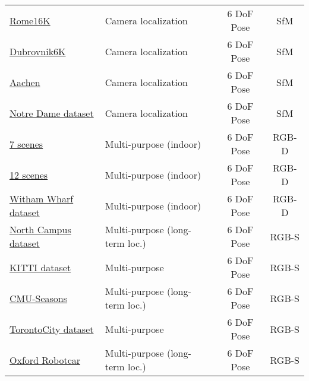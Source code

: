 \begin{landscape}
\begin{table}
{\begin{tabular}{l  l  c  c}
			\href{http://www.cs.cornell.edu/projects/p2f/}{Rome16K} \citep{Li2010} & Camera localization & 6 DoF Pose & SfM \\
			\href{http://www.cs.cornell.edu/projects/p2f/}{Dubrovnik6K} \citep{Li2010} & Camera localization & 6 DoF Pose & SfM \\
			\href{https://www.graphics.rwth-aachen.de/software/image-localization}{Aachen} \citep{Sattler2012a} & Camera localization & 6 DoF Pose & SfM \\
			\href{http://phototour.cs.washington.edu/datasets/}{Notre Dame dataset} \citep{Snavely2006} & Camera localization & 6 DoF Pose & SfM \\[3pt]
			\href{https://www.microsoft.com/en-us/research/project/rgb-d-dataset-7-scenes/}{7 scenes} \citep{Shotton2013} & Multi-purpose (indoor) & 6 DoF Pose & RGB-D \\
			\href{http://graphics.stanford.edu/projects/reloc/}{12 scenes} \citep{Valentin2016} & Multi-purpose (indoor) & 6 DoF Pose & RGB-D \\			
			\href{https://strands.pdc.kth.se/public/Witham_Wharf_RGB-D_dataset/}{Witham Wharf dataset} \citep{Krajnik2014} & Multi-purpose (indoor) & 6 DoF Pose & RGB-D \\		
			\href{http://robots.engin.umich.edu/nclt/}{North Campus dataset} \citep{Carlevaris-Bianco2016} & Multi-purpose (long-term loc.) & 6 DoF Pose & RGB-S \\			
			\href{http://www.cvlibs.net/datasets/kitti/}{KITTI dataset} \citep{Menze2015} & Multi-purpose & 6 DoF Pose & RGB-S \\
			\href{http://www.cs.cmu.edu/~aayushb/localization/}{CMU-Seasons} \citep{Bansal2014a} & Multi-purpose (long-term loc.) & 6 DoF Pose & RGB-S \\
			\href{?}{TorontoCity dataset} \citep{Wang2016} & Multi-purpose & 6 DoF Pose & RGB-S \\
			\href{http://mrg.robots.ox.ac.uk/the-oxford-robotcar-dataset/}{Oxford Robotcar} \citep{Maddern2016} & Multi-purpose (long-term loc.) & 6 DoF Pose & RGB-S  \\
			\hline	
		\end{tabular}
	}
\end{table}
\end{landscape}
